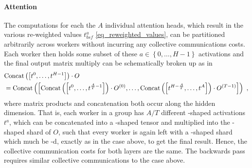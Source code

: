 \documentclass[11pt]{article}
\begin{document}
\paragraph{Attention} The computations for each the $ A $ individual attention heads, which result
in the various re-weighted values $ t ^{ a }_{ bsf } $ \eqref{eq_reweighted_values}, can be
partitioned arbitrarily across workers without incurring any collective communications costs.  Each
worker then holds some subset of these $ a \in \left \{ 0, \ldots , H-1 \right \} $ activations and
the final output matrix multiply can be schematically broken up as in \begin{align}                                                                                                                                                                                                                                                                                                                 & {\rm Concat}
                                                                                                                                                                                                                                                  \left ( \left [ t ^{ 0 }, \ldots , t ^{ H-1 } \right ] \right ) \cdot O \nonumber\\ & = {\rm Concat}
                                                                                                                                                                                                                                                  \left ( \left [ {\rm Concat}\left ( \left [ t ^{ 0 }, \ldots , t ^{ \frac{ A }{ T }-1 } \right
	                                                                                                                                                                                                                                                  ] \right ) \cdot O ^{ (0) }, \ldots ,{\rm Concat}\left ( \left [ t ^{ H-\frac{ A }{ T } },
		                                                                                                                                                                                                                                                  \ldots , t ^{ A} \right ] \right ) \cdot O ^{ (T-1) } \right ] \right ) \ ,\end{align} where matrix
products and concatenation both occur along the hidden dimension. That is, each worker in a group
has $ A/T $ different -shaped activations $ t ^{ a } $, which can be
concatenated into a -shaped tensor and multiplied into the
-shaped shard of $ O $, such that every worker is again left with a
-shaped shard which much be -d, exactly as in the
 case above, to get the final result.  Hence, the collective communication costs for both layers are the same.
The backwards pass requires similar collective communications to the 
case above.
\end{document}
